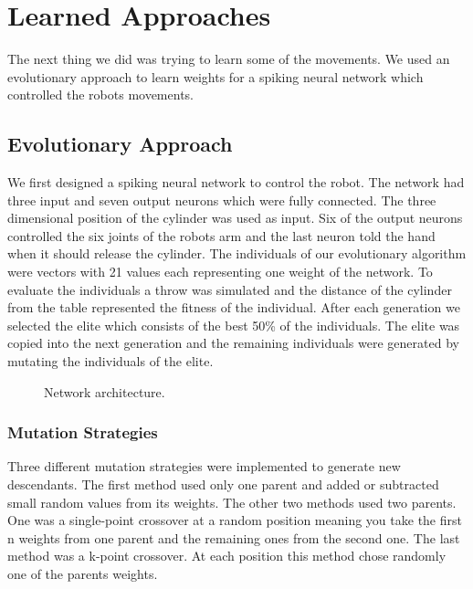 \section{Learned Approaches}
The next thing we did was trying to learn some of the movements.
We used an evolutionary approach to learn weights for a spiking neural network which controlled the robots movements.

\subsection{Evolutionary Approach}
We first designed a spiking neural network to control the robot.
The network had three input and seven output neurons which were fully connected.
The three dimensional position of the cylinder was used as input.
Six of the output neurons controlled the six joints of the robots arm and the last neuron told the hand when it should release the cylinder.
The individuals of our evolutionary algorithm were vectors with 21 values each representing one weight of the network.
To evaluate the individuals a throw was simulated and the distance of the cylinder from the table represented the fitness of the individual.
After each generation we selected the elite which consists of the best 50\% of the individuals.
The elite was copied into the next generation and the remaining individuals were generated by mutating the individuals of the elite.

\begin{figure}[htbp]
\centerline{}
\caption{Network architecture.}
\label{fig}
\end{figure}

\subsubsection{Mutation Strategies}
Three different mutation strategies were implemented to generate new descendants.
The first method used only one parent and added or subtracted small random values from its weights.
The other two methods used two parents.
One was a single-point crossover at a random position meaning you take the first n weights from one parent and the remaining ones from the second one.
The last method was a k-point crossover.
At each position this method chose randomly one of the parents weights.

